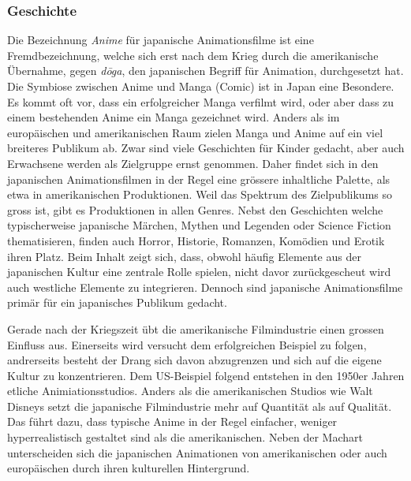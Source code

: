 \subsubsection{Geschichte}
Die Bezeichnung \emph{Anime} für japanische Animationsfilme ist eine Fremdbezeichnung, welche sich erst nach dem Krieg durch die amerikanische Übernahme, gegen \emph{d\={o}ga}, den japanischen Begriff für Animation, durchgesetzt hat. Die Symbiose zwischen Anime und Manga (Comic) ist in Japan eine Besondere. Es kommt oft vor, dass ein erfolgreicher Manga verfilmt wird, oder aber dass zu einem bestehenden Anime ein Manga gezeichnet wird. 
Anders als im europäischen und amerikanischen Raum zielen Manga und Anime auf ein viel breiteres Publikum ab. Zwar sind viele Geschichten für Kinder gedacht, aber auch Erwachsene werden als Zielgruppe ernst genommen. Daher findet sich in den japanischen Animationsfilmen in der Regel eine grössere inhaltliche Palette, als etwa in amerikanischen Produktionen. Weil das Spektrum des Zielpublikums so gross ist, gibt es Produktionen in allen Genres. Nebst den Geschichten welche typischerweise japanische Märchen, Mythen und Legenden oder Science Fiction thematisieren, finden auch Horror, Historie, Romanzen, Komödien und Erotik ihren Platz. Beim Inhalt zeigt sich, dass, obwohl häufig Elemente aus der japanischen Kultur eine zentrale Rolle spielen, nicht davor zurückgescheut wird auch westliche Elemente zu integrieren. Dennoch sind japanische Animationsfilme primär für ein japanisches Publikum gedacht. 

Gerade nach der Kriegszeit übt die amerikanische Filmindustrie einen grossen Einfluss aus. Einerseits wird versucht dem erfolgreichen Beispiel zu folgen, andrerseits besteht der Drang sich davon abzugrenzen und sich auf die eigene Kultur zu konzentrieren. Dem US-Beispiel folgend entstehen in den 1950er Jahren etliche Animiationsstudios. Anders als die amerikanischen Studios wie Walt Disneys setzt die japanische Filmindustrie mehr auf Quantität als auf Qualität. Das führt dazu, dass typische Anime in der Regel einfacher, weniger hyperrealistisch gestaltet sind als die amerikanischen. Neben der Machart unterscheiden sich die japanischen Animationen von amerikanischen oder auch europäischen durch ihren kulturellen Hintergrund. 

